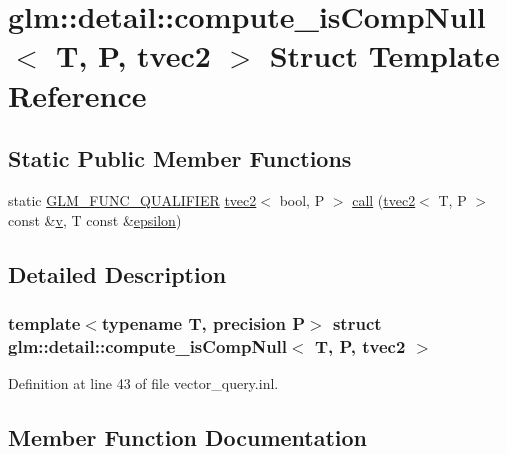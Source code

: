 \hypertarget{structglm_1_1detail_1_1compute__is_comp_null_3_01_t_00_01_p_00_01tvec2_01_4}{}\section{glm\+::detail\+::compute\+\_\+is\+Comp\+Null$<$ T, P, tvec2 $>$ Struct Template Reference}
\label{structglm_1_1detail_1_1compute__is_comp_null_3_01_t_00_01_p_00_01tvec2_01_4}
\subsection*{Static Public Member Functions}
\begin{DoxyCompactItemize}
\item 
static \mbox{\hyperlink{setup_8hpp_a33fdea6f91c5f834105f7415e2a64407}{G\+L\+M\+\_\+\+F\+U\+N\+C\+\_\+\+Q\+U\+A\+L\+I\+F\+I\+ER}} \mbox{\hyperlink{structglm_1_1tvec2}{tvec2}}$<$ bool, P $>$ \mbox{\hyperlink{structglm_1_1detail_1_1compute__is_comp_null_3_01_t_00_01_p_00_01tvec2_01_4_ac0a15e2120dff188297158f1aa716a0e}{call}} (\mbox{\hyperlink{structglm_1_1tvec2}{tvec2}}$<$ T, P $>$ const \&\mbox{\hyperlink{glad_8h_a14cfbe2fc2234f5504618905b69d1e06}{v}}, T const \&\mbox{\hyperlink{group__gtc__constants_ga2a1e57fc5592b69cfae84174cbfc9429}{epsilon}})
\end{DoxyCompactItemize}


\subsection{Detailed Description}
\subsubsection*{template$<$typename T, precision P$>$\newline
struct glm\+::detail\+::compute\+\_\+is\+Comp\+Null$<$ T, P, tvec2 $>$}



Definition at line 43 of file vector\+\_\+query.\+inl.



\subsection{Member Function Documentation}
\mbox{\label{structglm_1_1detail_1_1compute__is_comp_null_3_01_t_00_01_p_00_01tvec2_01_4_ac0a15e2120dff188297158f1aa716a0e}} 
